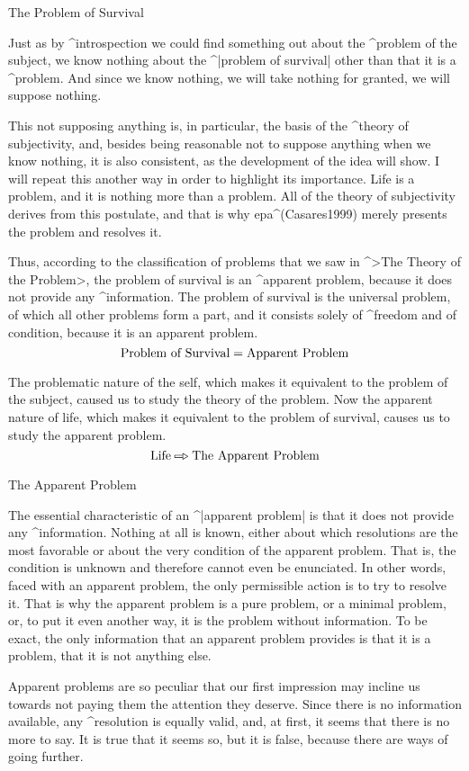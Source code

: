 \Section The Problem of Survival

Just as by ^{introspection} we could find something out about the
^{problem of the subject}, we know nothing about the ^|problem of
survival| other than that it is a ^{problem}. And since we know nothing,
we will take nothing for granted, we will suppose nothing.

This not supposing anything is, in particular, the basis of the ^{theory
of subjectivity}, and, besides being reasonable not to suppose anything
when we know nothing, it is also consistent, as the development of the
idea will show. I will repeat this another way in order to highlight its
importance. Life is a problem, and it is nothing more than a problem.
All of the theory of subjectivity derives from this postulate, and that
is why {\sc epa}^(Casares1999) merely presents the problem and resolves
it.

Thus, according to the classification of problems that we saw in ^>The
Theory of the Problem>, the problem of survival is an ^{apparent
problem}, because it does not provide any ^{information}. The problem of
survival is the universal problem, of which all other problems form a
part, and it consists solely of ^{freedom} and of condition, because it
is an apparent problem.
$$\hbox{Problem of Survival} = \hbox{Apparent Problem}$$

The problematic nature of the self, which makes it equivalent to the
problem of the subject, caused us to study the theory of the problem.
Now the apparent nature of life, which makes it equivalent to the
problem of survival, causes us to study the apparent problem.
$$\hbox{Life} \etapa \hbox{The Apparent Problem}$$


\Section The Apparent Problem

The essential characteristic of an ^|apparent problem| is that it does
not provide any ^{information}. Nothing at all is known, either about
which resolutions are the most favorable or about the very condition of
the apparent problem. That is, the condition is unknown and therefore
cannot even be enunciated. In other words, faced with an apparent
problem, the only permissible action is to try to resolve it. That is
why the apparent problem is a pure problem, or a minimal problem, or, to
put it even another way, it is the problem without information. To be
exact, the only information that an apparent problem provides is that it
is a problem, that it is not anything else.

Apparent problems are so peculiar that our first impression may incline
us towards not paying them the attention they deserve. Since there is no
information available, any ^{resolution} is equally valid, and, at
first, it seems that there is no more to say. It is true that it seems
so, but it is false, because there are ways of going further.

